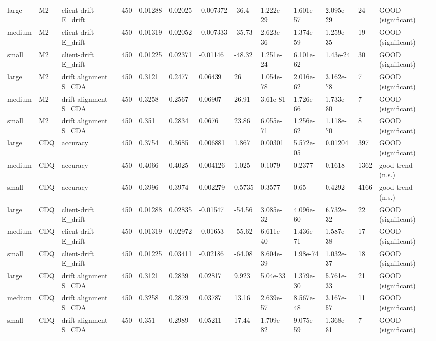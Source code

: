 \begin{table}[t]
\begin{tabular}{lllllllllllll}
large & M2 & client-drift E\_drift & 450 & 0.01288 & 0.02025 & -0.007372 & -36.4 & 1.222e-29 & 1.601e-57 & 2.095e-29 & 24 & GOOD (significant) \\
medium & M2 & client-drift E\_drift & 450 & 0.01319 & 0.02052 & -0.007333 & -35.73 & 2.623e-36 & 1.374e-59 & 1.259e-35 & 19 & GOOD (significant) \\
small & M2 & client-drift E\_drift & 450 & 0.01225 & 0.02371 & -0.01146 & -48.32 & 1.251e-24 & 6.101e-62 & 1.43e-24 & 30 & GOOD (significant) \\
large & M2 & drift alignment S\_CDA & 450 & 0.3121 & 0.2477 & 0.06439 & 26 & 1.054e-78 & 2.016e-62 & 3.162e-78 & 7 & GOOD (significant) \\
medium & M2 & drift alignment S\_CDA & 450 & 0.3258 & 0.2567 & 0.06907 & 26.91 & 3.61e-81 & 1.726e-66 & 1.733e-80 & 7 & GOOD (significant) \\
small & M2 & drift alignment S\_CDA & 450 & 0.351 & 0.2834 & 0.0676 & 23.86 & 6.055e-71 & 1.256e-62 & 1.118e-70 & 8 & GOOD (significant) \\
large & CDQ & accuracy & 450 & 0.3754 & 0.3685 & 0.006881 & 1.867 & 0.00301 & 5.572e-05 & 0.01204 & 397 & GOOD (significant) \\
medium & CDQ & accuracy & 450 & 0.4066 & 0.4025 & 0.004126 & 1.025 & 0.1079 & 0.2377 & 0.1618 & 1362 & good trend (n.s.) \\
small & CDQ & accuracy & 450 & 0.3996 & 0.3974 & 0.002279 & 0.5735 & 0.3577 & 0.65 & 0.4292 & 4166 & good trend (n.s.) \\
large & CDQ & client-drift E\_drift & 450 & 0.01288 & 0.02835 & -0.01547 & -54.56 & 3.085e-32 & 4.096e-60 & 6.732e-32 & 22 & GOOD (significant) \\
medium & CDQ & client-drift E\_drift & 450 & 0.01319 & 0.02972 & -0.01653 & -55.62 & 6.611e-40 & 1.436e-71 & 1.587e-38 & 17 & GOOD (significant) \\
small & CDQ & client-drift E\_drift & 450 & 0.01225 & 0.03411 & -0.02186 & -64.08 & 8.604e-39 & 1.98e-74 & 1.032e-37 & 18 & GOOD (significant) \\
large & CDQ & drift alignment S\_CDA & 450 & 0.3121 & 0.2839 & 0.02817 & 9.923 & 5.04e-33 & 1.379e-30 & 5.761e-33 & 21 & GOOD (significant) \\
medium & CDQ & drift alignment S\_CDA & 450 & 0.3258 & 0.2879 & 0.03787 & 13.16 & 2.639e-57 & 8.567e-48 & 3.167e-57 & 11 & GOOD (significant) \\
small & CDQ & drift alignment S\_CDA & 450 & 0.351 & 0.2989 & 0.05211 & 17.44 & 1.709e-82 & 9.075e-59 & 1.368e-81 & 7 & GOOD (significant) \\
\bottomrule
\end{tabular}
\end{table}